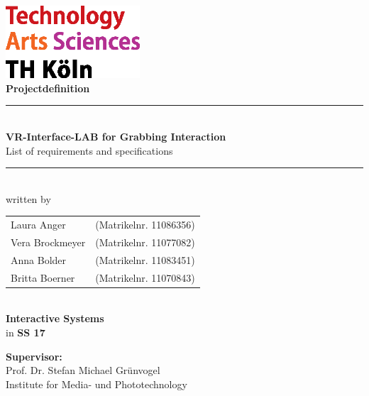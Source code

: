 \thispagestyle{empty}
\begin{center}
			\includegraphics[width=5cm]{Bilder/logo_TH}\\[12ex]
			{\Huge\textbf{Projectdefinition}}\\[8ex]
			\rule{.8\textwidth}{.2pt}
			{\Large\\[1ex] \textbf{VR-Interface-LAB for Grabbing Interaction}}\\
			{List of requirements and specifications }\\
			\rule{.8\textwidth}{.2pt}\\[10ex]
			written by\\[2ex]
			\begin{tabular}{ll}
			Laura Anger &(Matrikelnr. 11086356)\\ 
			Vera Brockmeyer &(Matrikelnr. 11077082)\\
			Anna Bolder &(Matrikelnr. 11083451)\\
			Britta Boerner &(Matrikelnr. 11070843)\\
			\end{tabular}\\[10ex]
			\textbf{Interactive Systems}\\
			in \textbf{SS 17}\\			
			\end{center}
			\vfill
			\begin{flushleft}
			{\bf Supervisor:}\\
			Prof. Dr. Stefan Michael Grünvogel\\
			Institute for Media- und Phototechnology
			\end{flushleft}
	\newpage